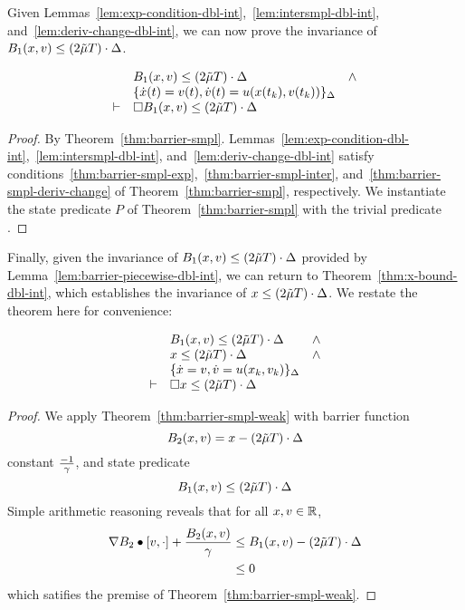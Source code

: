 Given Lemmas~\ref{lem:exp-condition-dbl-int},~\ref{lem:intersmpl-dbl-int},
and~\ref{lem:deriv-change-dbl-int}, we can now prove the invariance of
$B_1 (x,v) \leq (2\tilde{\mu} T) \cdot \Delta$.

\begin{lemma}
\[
\begin{array}{clc}
&
B_1 (x,v) \leq (2\tilde{\mu} T) \cdot \Delta & \wedge \\
& \{\dot{x}(t) = v(t), \dot{v}(t) = u(x(t_k),v(t_k))\}_{\Delta} & \\
\vdash
&
\Box{} B_1 (x,v) \leq (2\tilde{\mu} T) \cdot \Delta &
\end{array}
\]
\label{lem:barrier-piecewise-dbl-int}
\end{lemma}
\begin{proof}
By
Theorem~\ref{thm:barrier-smpl}. Lemmas~\ref{lem:exp-condition-dbl-int},~\ref{lem:intersmpl-dbl-int},
and~\ref{lem:deriv-change-dbl-int} satisfy
conditions~\eqref{thm:barrier-smpl-exp},~\eqref{thm:barrier-smpl-inter},
and~\eqref{thm:barrier-smpl-deriv-change} of
Theorem~\ref{thm:barrier-smpl}, respectively. We instantiate the state
predicate $P$ of Theorem~\ref{thm:barrier-smpl} with the trivial predicate
\True.
\end{proof}

Finally, given the invariance of $B_1 (x,v) \leq (2\tilde{\mu} T) \cdot \Delta$
provided by Lemma~\ref{lem:barrier-piecewise-dbl-int}, we can return to
Theorem~\ref{thm:x-bound-dbl-int}, which establishes the invariance of $x
\leq (2\tilde{\mu} T) \cdot \Delta$. We restate the theorem here for convenience:

\begin{theorem}
\[
\begin{array}{clc}
&
B_1 (x,v) \leq (2\tilde{\mu} T) \cdot \Delta & \wedge \\
&
x \leq (2\tilde{\mu} T) \cdot \Delta & \wedge \\
&
\{\dot{x} = v, \dot{v} = u(x_k,v_k)\}_{\Delta} & \\
\vdash
&
\Box{} x \leq (2\tilde{\mu} T) \cdot \Delta &
\end{array}
\]
\label{thm:x-bound-dbl-int}
\end{theorem}
\begin{proof}
We apply Theorem~\ref{thm:barrier-smpl-weak} with barrier function
\[
B_2 (x,v) = x - (2\tilde{\mu} T)\cdot \Delta\]
constant $\frac{-1}{\gamma}$, and state predicate
\[
B_1 (x,v) \leq (2\tilde{\mu} T) \cdot \Delta
\]
Simple arithmetic reasoning reveals
that for all $x,v \in \mathbb{R}$,
\begin{align}
\nabla B_2 \bullet [v,\cdot] + \frac{B_2 (x,v)}{\gamma} &\leq B_1 (x,v) - (2\tilde{\mu} T)\cdot \Delta \\
&\leq 0
\end{align}
which satifies the premise of Theorem~\ref{thm:barrier-smpl-weak}.
\end{proof}

